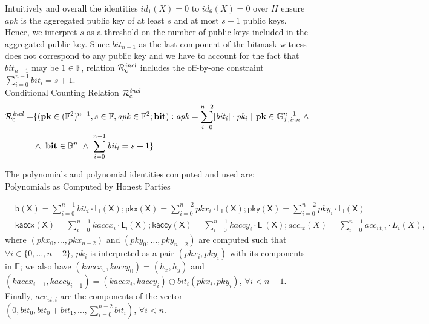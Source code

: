 \noindent Intuitively and overall the identities $id_1(X)=0$ to $id_6(X)=0$ over $H$ 
ensure $\mathit{apk}$ is the aggregated public key of at least $s$ and at most $s+1$ public keys. 
Hence, we interpret $s$ as a threshold on the number of public keys included in the aggregated public key. 
Since $\mathit{bit_{n-1}}$ as the last component of the bitmask witness does not correspond to any public 
key and we have to account for the fact that $\mathit{bit_{n-1}}$ may be 
$1 \in \mathbb{F}$, relation $\mathcal{R}^{\mathit{incl}}_{\mathsf{c}}$ includes the off-by-one constraint $\sum_{i=0}^{n-1} \mathit{bit_i} = s+1$.\\

\noindent \textsf{Conditional Counting Relation $\mathcal{R}^{\mathit{incl}}_{\mathsf{c}}$}  
\begin{equation*}
\begin{split}
 \Rvt = & \{(\mathbf{pk} \in (\mathbb{F}^2)^{n-1}, s \in \mathbb{F}, \mathit{apk} \in \mathbb{F}^2; \mathbf{bit}) : 
 \mathit{apk} = \sum_{i=0}^{n-2} [\mathit{bit_i}]  \cdot \mathit{pk_i} \ | \ \mathbf{pk}  \in \ginn{1}^{n-1} \ \wedge \\ 
& \wedge \ \mathbf{bit} \in \mathbb{B}^n \ \wedge \ \sum_{i=0}^{n-1} \mathit{bit_i} = s+1\} 
\end{split}
\end{equation*}

\noindent The polynomials and polynomial identities computed and used are: \\

\noindent \textsf{Polynomials as Computed by Honest Parties} 

\begin{align*}
&\mathsf{b(X)} = \sum_{i=0}^{n-1} \mathit{bit_i} \cdot \mathsf{L_i(X)}; \mathsf{pkx(X)} =  \sum_{i=0}^{n-2} \mathit{pkx_i} \cdot \mathsf{L_i(X)}; 
\mathsf{pky(X)} =  \sum_{i=0}^{n-2} \mathit{pky_i} \cdot \mathsf{L_i(X)} \\
&\mathsf{kaccx(X)}  =  \sum_{i=0}^{n-1} \mathit{kaccx_i} \cdot \mathsf{L_i(X)}; \mathsf{kaccy(X)}  = \sum_{i=0}^{n-1} \mathit{kaccy_i} \cdot \mathsf{L_i(X)}; 
acc_{vt}(X)  = \sum_{i=0}^{n-1} acc_{vt,i} \cdot L_i(X),
\end{align*}
\noindent where $(\mathit{pkx_0}, \ldots, \mathit{pkx_{n-2}})$ 
and $(\mathit{pky_0}, \ldots, \mathit{pky_{n-2}})$ are computed such that $\forall i \in \{0, \ldots, n-2\}$, $\mathit{pk_i}$ 
is interpreted as a pair $(\mathit{pkx_i}, \mathit{pky_i})$ with its components in $\mathbb{F}$; we also have 
$(\mathit{kaccx_{0}}, \mathit{kaccy_{0}}) = (\mathit{h_x}, \mathit{h_y})$ and 
$(\mathit{kaccx_{i+1}}, \mathit{kaccy_{i+1}}) =  (\mathit{kaccx_{i}}, \mathit{kaccy_{i}}) \oplus \mathit{bit_i}(\mathit{pkx_{i}}, \mathit{pky_{i}})$, 
$\forall i < n-1$. Finally, $acc_{vt,i}$ are the components of the vector 
$(0, \mathit{bit_0}, \mathit{bit_0} + \mathit{bit_1}, \ldots, \sum_{i=0}^{n-2}\mathit{bit_i})$, $\forall i < n$. \\

